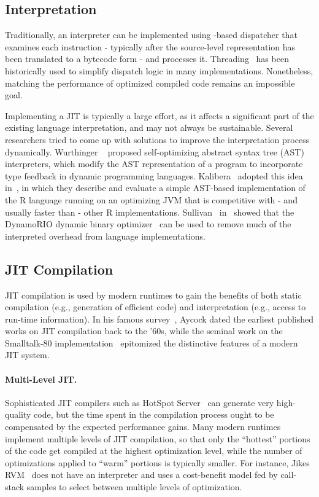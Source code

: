 \subsection*{Interpretation}
Traditionally, an interpreter can be implemented using -based dispatcher that examines each instruction - typically after the source-level representation has been translated to a bytecode form - and processes it. Threading~\cite{Bell73} has been historically used to simplify dispatch logic in many implementations. Nonetheless, matching the performance of optimized compiled code remains an impossible goal.

Implementing a JIT is typically a large effort, as it affects a significant part of the existing language interpretation, and may not always be sustainable. Several researchers tried to come up with solutions to improve the interpretation process dynamically. Wurthinger \etal~\cite{Wurthinger12} proposed self-optimizing abstract syntax tree (AST) interpreters, which modify the AST representation of a program to incorporate type feedback in dynamic programming languages. Kalibera \etal\ adopted this idea in~\cite{Kalibera14}, in which they describe and evaluate a simple AST-based implementation of the R language running on an optimizing JVM that is competitive with - and usually faster than - other R implementations. Sullivan \etal\ in~\cite{Sullivan03} showed that the DynamoRIO dynamic binary optimizer~\cite{Bala00} can be used to remove much of the interpreted overhead from language implementations.

\subsection*{JIT Compilation}

JIT compilation is used by modern runtimes to gain the benefits of both static compilation (e.g., generation of efficient code) and interpretation (e.g., access to run-time information). In his famous survey~\cite{Aycock03}, Aycock dated the earliest published works on JIT compilation back to the '60s, while the seminal work on the Smalltalk-80 implementation~\cite{Deutsch84} epitomized the distinctive features of a modern JIT system.

\paragraph*{Multi-Level JIT.} Sophisticated JIT compilers such as HotSpot Server~\cite{Paleczny01} can generate very high-quality code, but the time spent in the compilation process ought to be compensated by the expected performance gains. Many modern runtimes implement multiple levels of JIT compilation, so that only the ``hottest'' portions of the code get compiled at the highest optimization level, while the number of optimizations applied to ``warm'' portions is typically smaller. For instance, Jikes RVM~\cite{Alpern00} does not have an interpreter and uses a cost-benefit model fed by call-stack samples to select between multiple levels of optimization.

